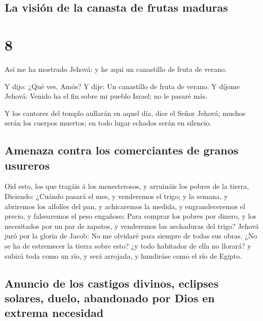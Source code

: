 \hypertarget{la-visiuxf3n-de-la-canasta-de-frutas-maduras}{%
\subsection{La visión de la canasta de frutas
maduras}\label{la-visiuxf3n-de-la-canasta-de-frutas-maduras}}

\hypertarget{section-30-8}{%
\section{8}\label{section-30-8}}

 Así me ha mostrado Jehová: y he aquí un canastillo de
fruta de verano.

 Y dijo: ¿Qué ves, Amós? Y dije: Un canastillo de fruta de
verano. Y díjome Jehová: Venido ha el fin sobre mi pueblo Israel; no le
pasaré más.

 Y los cantores del templo aullarán en aquel día, dice el
Señor Jehová; muchos serán los cuerpos muertos; en todo lugar echados
serán en silencio.

\hypertarget{amenaza-contra-los-comerciantes-de-granos-usureros}{%
\subsection{Amenaza contra los comerciantes de granos
usureros}\label{amenaza-contra-los-comerciantes-de-granos-usureros}}

 Oid esto, los que tragáis á los menesterosos, y arruináis
los pobres de la tierra,  Diciendo: ¿Cuándo pasará el mes,
y venderemos el trigo; y la semana, y abriremos los alfolíes del pan, y
achicaremos la medida, y engrandeceremos el precio, y falsearemos el
peso engañoso;  Para comprar los pobres por dinero, y los
necesitados por un par de zapatos, y venderemos las aechaduras del
trigo?  Jehová juró por la gloria de Jacob: No me olvidaré
para siempre de todas sus obras.  ¿No se ha de estremecer
la tierra sobre esto? ¿y todo habitador de ella no llorará? y subirá
toda como un río, y será arrojada, y hundiráse como el río de Egipto.

\hypertarget{anuncio-de-los-castigos-divinos-eclipses-solares-duelo-abandonado-por-dios-en-extrema-necesidad}{%
\subsection{Anuncio de los castigos divinos, eclipses solares, duelo,
abandonado por Dios en extrema
necesidad}\label{anuncio-de-los-castigos-divinos-eclipses-solares-duelo-abandonado-por-dios-en-extrema-necesidad}}

